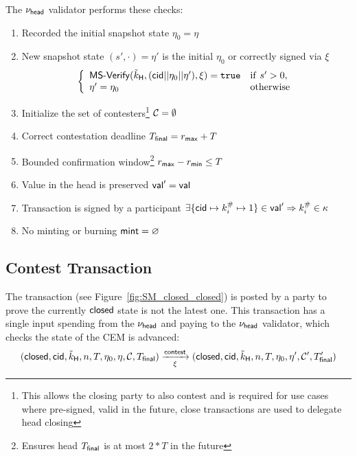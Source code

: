 \noindent The $\nu_\mathsf{head}$ validator performs these checks:
\begin{enumerate}
  \item Recorded the initial snapshot state $\eta_0 = \eta$
  \item New snapshot state $(s', \cdot) = \eta'$ is the initial $\eta_{0}$
        or correctly signed via $\xi$ \\
        \[
          \left\{\begin{array}{ll}
                  \mathsf{MS\textsf{-}{}Verify}(\tilde{k}_{\mathsf{H}},(\mathsf{cid} || \eta_{0} || \eta'),\xi) = \mathtt{true} & \mathrm{if} ~ s' > 0, \\
                  \eta' = \eta_{0} & \mathrm{otherwise}
                 \end{array}\right.
        \]
  \item Initialize the set of contesters\footnote{This allows the closing party
        to also contest and is required for use cases where pre-signed, valid in
        the future, close transactions are used to delegate head closing}
        $\mathcal{C} = \emptyset$
  \item Correct contestation deadline $T_{\mathsf{final}} = r_{\mathsf{max}} + T$
  \item Bounded confirmation window\footnote{Ensures head $T_{\mathsf{final}}$ is at most
        $2*T$ in the future} $r_{\mathsf{max}} - r_{\mathsf{min}} \leq T$
  \item Value in the head is preserved $\mathsf{val}' = \mathsf{val}$
  \item Transaction is signed by a participant $\exists \{\mathsf{cid} \mapsto k^{\#}_{i} \mapsto 1\} \in \mathsf{val}' \Rightarrow k^{\#}_{i} \in \kappa$
  \item No minting or burning $\mathsf{mint} = \varnothing$
\end{enumerate}

\subsection{Contest Transaction}\label{sec:contest-tx}



The \mtxContest{} transaction (see Figure~\ref{fig:SM_closed_closed}) is posted
by a party to prove the currently $\mathsf{closed}$ state is not the latest one. This
transaction has a single input spending from the $\nu_\mathsf{head}$ and paying to the
$\nu_\mathsf{head}$ validator, which checks the state of the CEM is advanced:
\[
  (\mathsf{closed},\mathsf{cid},\tilde{k}_{\mathsf{H}},n,T,\eta_0,\eta,\mathcal{C},T_{\mathsf{final}}) \xrightarrow[\xi]{\mathsf{contest}} (\mathsf{closed},\mathsf{cid},\tilde{k}_{\mathsf{H}},n,T,\eta_0,\eta',\mathcal{C}',T_{\mathsf{final}}')
\]


